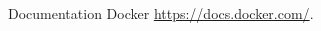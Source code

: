 \documentclass[a4paper]{report}
\begin{document}
\newcommand{\HRule}{\rule{\linewidth}{0.5mm}}


\newpage
~
\thispagestyle{empty}
\newpage


\tableofcontents
\thispagestyle{empty}
\setcounter{page}{0}

\newpage

\renewcommand{\arraystretch}{1.5}


\thispagestyle{empty}
\setcounter{page}{0}
\newpage

	   




\newpage



\newpage
\begin{thebibliography}{9}

          Documentation Docker
          \url{https://docs.docker.com/}.

\end{thebibliography}
\end{document}
